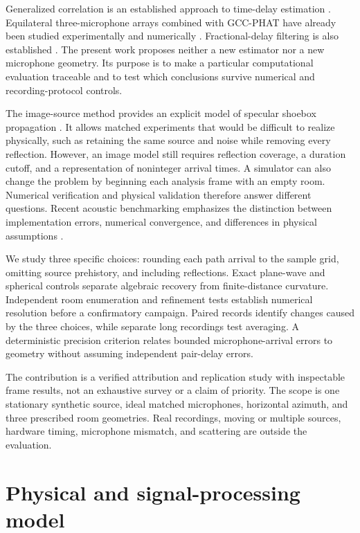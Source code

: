 \documentclass[10pt,a4paper,twocolumn]{article}
\begin{document}
Generalized correlation is an established approach to time-delay estimation \citep{knapp}. Equilateral three-microphone arrays combined with GCC-PHAT have already been studied experimentally and numerically \citep{catur}. Fractional-delay filtering is also established \citep{laakso}. The present work proposes neither a new estimator nor a new microphone geometry. Its purpose is to make a particular computational evaluation traceable and to test which conclusions survive numerical and recording-protocol controls.

The image-source method provides an explicit model of specular shoebox propagation \citep{allen}. It allows matched experiments that would be difficult to realize physically, such as retaining the same source and noise while removing every reflection. However, an image model still requires reflection coverage, a duration cutoff, and a representation of noninteger arrival times. A simulator can also change the problem by beginning each analysis frame with an empty room. Numerical verification and physical validation therefore answer different questions. Recent acoustic benchmarking emphasizes the distinction between implementation errors, numerical convergence, and differences in physical assumptions \citep{ernoult}.

We study three specific choices: rounding each path arrival to the sample grid, omitting source prehistory, and including reflections. Exact plane-wave and spherical controls separate algebraic recovery from finite-distance curvature. Independent room enumeration and refinement tests establish numerical resolution before a confirmatory campaign. Paired records identify changes caused by the three choices, while separate long recordings test averaging. A deterministic precision criterion relates bounded microphone-arrival errors to geometry without assuming independent pair-delay errors.

The contribution is a verified attribution and replication study with inspectable frame results, not an exhaustive survey or a claim of priority. The scope is one stationary synthetic source, ideal matched microphones, horizontal azimuth, and three prescribed room geometries. Real recordings, moving or multiple sources, hardware timing, microphone mismatch, and scattering are outside the evaluation.

\section{Physical and signal-processing model}
\end{document}
